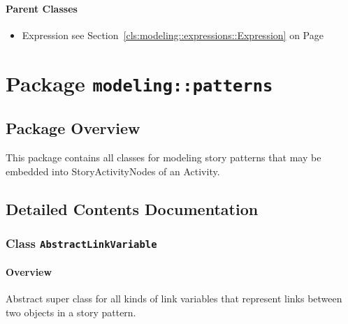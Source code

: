 \paragraph{Parent Classes}
\begin{itemize}
\item Expression see Section~\ref{cls:modeling::expressions::Expression} on Page~\pageref{cls:modeling::expressions::Expression}\end{itemize}
\newpage
		


\section{Package \bfseries \texttt{modeling::patterns}\normalfont}
\subsection{Package Overview}
	
			
This package contains all classes for modeling story patterns that may be 
embedded into StoryActivityNodes of an Activity.	
		
	
			
		



\subsection{Detailed Contents Documentation}
\subsubsection{\Large{Class \bfseries \texttt{AbstractLinkVariable}\normalfont}}
\label{cls:modeling::patterns::AbstractLinkVariable} 
\paragraph{Overview}

	
			
Abstract super class for all kinds of link variables that represent links between two objects in a story pattern.	
		
	



